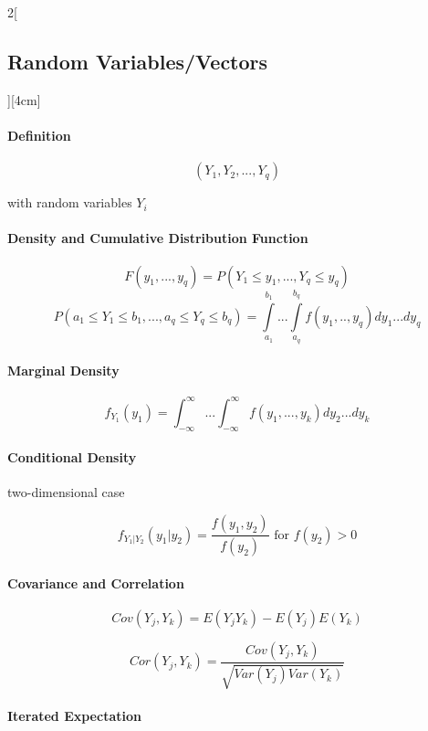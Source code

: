 \documentclass[8pt]{extarticle}
\begin{document}
\begin{multicols}{2}[\subsection{Random Variables/Vectors}][4cm]
\paragraph{Definition}

$$(Y_1,Y_2,...,Y_q)$$ 

with random variables $Y_i$ 

\paragraph{Density and Cumulative Distribution Function}

$$F(y_1, ..., y_q) = P(Y_1 \leq y_1, ..., Y_q \leq y_q)$$
$$P(a_1 {\leq} Y_1 {\leq} b_1, ..., a_q {\leq} Y_q {\leq} b_q) = \int\limits_{a_1}^{b_1} ...\int\limits_{a_q}^{b_q} f(y_1, .., y_q)dy_1...dy_q$$

\paragraph{Marginal Density}

$$f_{Y_1}(y_1) = \int_{-\infty}^{\infty}...\int_{-\infty}^{\infty} f(y_1,...,y_k)dy_2...dy_k$$

\paragraph{Conditional Density} two-dimensional case

$$f_{Y_1|Y_2}(y_1|y_2) = \frac{f(y_1, y_2)}{f(y_2)} \text{ for } f(y_2) > 0$$

\paragraph{Covariance and Correlation}

$$Cov(Y_j,Y_k) = E(Y_jY_k) - E(Y_j)E(Y_k)$$

$$Cor(Y_j,Y_k) = \frac{Cov(Y_j,Y_k)}{\sqrt{Var(Y_j)Var(Y_k)}}$$

\paragraph{Iterated Expectation}


\end{multicols}
\end{document}
